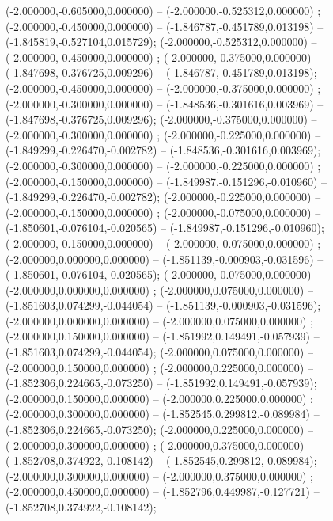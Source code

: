  (-2.000000,-0.605000,0.000000) -- (-2.000000,-0.525312,0.000000) ;
 (-2.000000,-0.450000,0.000000) -- (-1.846787,-0.451789,0.013198) -- (-1.845819,-0.527104,0.015729);
 (-2.000000,-0.525312,0.000000) -- (-2.000000,-0.450000,0.000000) ;
 (-2.000000,-0.375000,0.000000) -- (-1.847698,-0.376725,0.009296) -- (-1.846787,-0.451789,0.013198);
 (-2.000000,-0.450000,0.000000) -- (-2.000000,-0.375000,0.000000) ;
 (-2.000000,-0.300000,0.000000) -- (-1.848536,-0.301616,0.003969) -- (-1.847698,-0.376725,0.009296);
 (-2.000000,-0.375000,0.000000) -- (-2.000000,-0.300000,0.000000) ;
 (-2.000000,-0.225000,0.000000) -- (-1.849299,-0.226470,-0.002782) -- (-1.848536,-0.301616,0.003969);
 (-2.000000,-0.300000,0.000000) -- (-2.000000,-0.225000,0.000000) ;
 (-2.000000,-0.150000,0.000000) -- (-1.849987,-0.151296,-0.010960) -- (-1.849299,-0.226470,-0.002782);
 (-2.000000,-0.225000,0.000000) -- (-2.000000,-0.150000,0.000000) ;
 (-2.000000,-0.075000,0.000000) -- (-1.850601,-0.076104,-0.020565) -- (-1.849987,-0.151296,-0.010960);
 (-2.000000,-0.150000,0.000000) -- (-2.000000,-0.075000,0.000000) ;
 (-2.000000,0.000000,0.000000) -- (-1.851139,-0.000903,-0.031596) -- (-1.850601,-0.076104,-0.020565);
 (-2.000000,-0.075000,0.000000) -- (-2.000000,0.000000,0.000000) ;
 (-2.000000,0.075000,0.000000) -- (-1.851603,0.074299,-0.044054) -- (-1.851139,-0.000903,-0.031596);
 (-2.000000,0.000000,0.000000) -- (-2.000000,0.075000,0.000000) ;
 (-2.000000,0.150000,0.000000) -- (-1.851992,0.149491,-0.057939) -- (-1.851603,0.074299,-0.044054);
 (-2.000000,0.075000,0.000000) -- (-2.000000,0.150000,0.000000) ;
 (-2.000000,0.225000,0.000000) -- (-1.852306,0.224665,-0.073250) -- (-1.851992,0.149491,-0.057939);
 (-2.000000,0.150000,0.000000) -- (-2.000000,0.225000,0.000000) ;
 (-2.000000,0.300000,0.000000) -- (-1.852545,0.299812,-0.089984) -- (-1.852306,0.224665,-0.073250);
 (-2.000000,0.225000,0.000000) -- (-2.000000,0.300000,0.000000) ;
 (-2.000000,0.375000,0.000000) -- (-1.852708,0.374922,-0.108142) -- (-1.852545,0.299812,-0.089984);
 (-2.000000,0.300000,0.000000) -- (-2.000000,0.375000,0.000000) ;
 (-2.000000,0.450000,0.000000) -- (-1.852796,0.449987,-0.127721) -- (-1.852708,0.374922,-0.108142);
